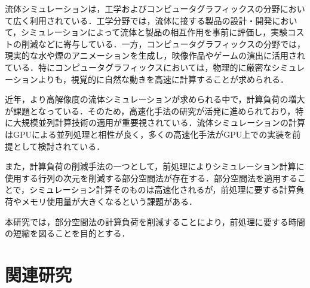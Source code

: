 \documentclass[a4j,12pt]{jreport}
\begin{document}
流体シミュレーションは，工学およびコンピュータグラフィックスの分野において広く利用されている．工学分野では，流体に接する製品の設計・開発において，シミュレーションによって流体と製品の相互作用を事前に評価し，実験コストの削減などに寄与している．一方，コンピュータグラフィックスの分野では，現実的な水や煙のアニメーションを生成し，映像作品やゲームの演出に活用されている．特にコンピュータグラフィックスにおいては，物理的に厳密なシミュレーションよりも，視覚的に自然な動きを高速に計算することが求められる．

近年，より高解像度の流体シミュレーションが求められる中で，計算負荷の増大が課題となっている．そのため，高速化手法の研究が活発に進められており，特に大規模並列計算技術の適用が重要視されている．流体シミュレーションの計算はGPUによる並列処理と相性が良く，多くの高速化手法がGPU上での実装を前提として検討されている．

また，計算負荷の削減手法の一つとして，前処理によりシミュレーション計算に使用する行列の次元を削減する部分空間法が存在する．部分空間法を適用することで，シミュレーション計算そのものは高速化されるが，前処理に要する計算負荷やメモリ使用量が大きくなるという課題がある．

本研究では，部分空間法の計算負荷を削減することにより，前処理に要する時間の短縮を図ることを目的とする．
\chapter{関連研究} \label{chapter:2}
\end{document}
